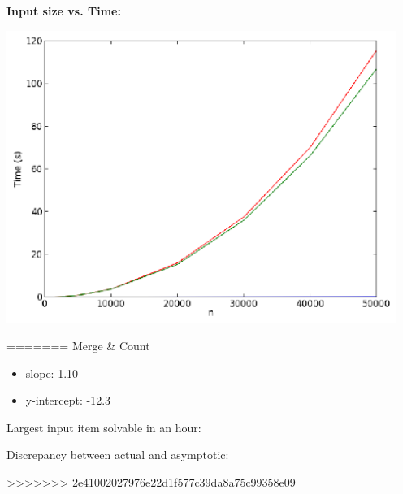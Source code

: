\documentclass[letterpaper,10pt,titlepage,fleqn]{article}
\begin{document}
\textbf{Input size vs. Time:}
\vskip 0.04in
\begin{center}
  \includegraphics[width=5in]{input_time.ps}
\end{center}
=======
Merge & Count
\begin{itemize}
\item slope: 1.10
\item y-intercept: -12.3
\end{itemize}

Largest input item solvable in an hour:

Discrepancy between actual and asymptotic:

>>>>>>> 2e41002027976e22d1f577c39da8a75c99358e09
\end{document}
